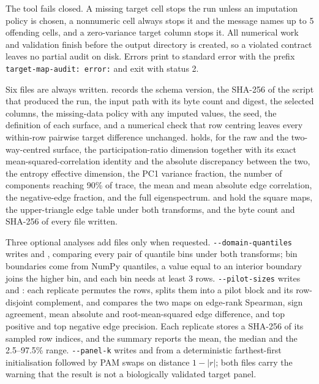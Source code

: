 The tool fails closed. A missing target cell stops the run unless an imputation policy is chosen,
a nonnumeric cell always stops it and the message names up to 5 offending cells, and a
zero-variance target column stops it. All numerical work and validation finish before the output
directory is created, so a violated contract leaves no partial audit on disk. Errors print to
standard error with the prefix \texttt{target-map-audit: error:} and exit with status 2.

Six files are always written.  records the schema version, the
SHA-256 of the script that produced the run, the input path with its byte count and digest, the
selected columns, the missing-data policy with any imputed values, the seed, the definition of
each surface, and a numerical check that row centring leaves every within-row pairwise target
difference unchanged.  holds, for the raw and the two-way-centred surface,
the participation-ratio dimension together with its exact mean-squared-correlation identity and
the absolute discrepancy between the two, the entropy effective dimension, the PC1 variance
fraction, the number of components reaching 90\% of trace, the mean and mean absolute edge
correlation, the negative-edge fraction, and the full eigenspectrum.
 and  hold the
square maps,  the upper-triangle edge table under both transforms, and
 the byte count and SHA-256 of every file written.

Three optional analyses add files only when requested. \texttt{-{}-domain-quantiles} writes
 and , comparing every pair of
quantile bins under both transforms; bin boundaries come from NumPy quantiles, a value equal to
an interior boundary joins the higher bin, and each bin needs at least 3 rows.
\texttt{-{}-pilot-sizes} writes  and
: each replicate permutes the rows, splits them into a pilot
block and its row-disjoint complement, and compares the two maps on edge-rank Spearman, sign
agreement, mean absolute and root-mean-squared edge difference, and top positive and top negative
edge precision. Each replicate stores a SHA-256 of its sampled row indices, and the summary
reports the mean, the median and the 2.5--97.5\% range. \texttt{-{}-panel-k} writes
 and  from a deterministic
farthest-first initialisation followed by PAM swaps on distance $1-|r|$; both files carry the
warning that the result is not a biologically validated target panel.

